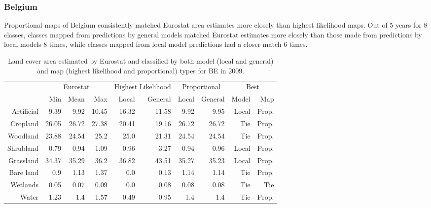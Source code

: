     \subsubsection{Belgium}
    Proportional maps of Belgium consistently matched Eurostat area estimates more closely than highest likelihood maps. Out of 5 years for 8 classes, classes mapped from predictions by general models matched Eurostat estimates more closely than those made from predictions by local models 8 times, while classes mapped from local model predictions had a closer match 6 times.
    \begin{table}[H]
    \centering
    \caption{Land cover area estimated by Eurostat and classified by both model (local and general) and map (highest likelihood and proportional) types for BE in 2009.}
    
    \begin{tabular}{r|rrr|rr|rr|rr}
    \toprule
    {} & \multicolumn{3}{|c}{Eurostat} & \multicolumn{2}{|c}{Highest Likelihood} & \multicolumn{2}{|c}{Proportional} & \multicolumn{2}{|c}{Best} \\
    {} &      Min &   Mean &    Max &              Local & General &        Local & General &  Model &    Map \\
    \midrule
    Artificial &     9.39 &   9.92 &  10.45 &              16.32 &   11.58 &         9.92 &    9.95 &  Local &  Prop. \\
    Cropland   &    26.05 &  26.72 &  27.38 &              20.41 &   19.16 &        26.72 &   26.72 &    Tie &  Prop. \\
    Woodland   &    23.88 &  24.54 &   25.2 &               25.0 &   21.31 &        24.54 &   24.54 &    Tie &  Prop. \\
    Shrubland  &     0.79 &   0.94 &   1.09 &               0.96 &    3.27 &         0.94 &    0.96 &  Local &  Prop. \\
    Grassland  &    34.37 &  35.29 &   36.2 &              36.82 &   43.51 &        35.27 &   35.23 &  Local &  Prop. \\
    Bare land  &      0.9 &   1.13 &   1.37 &                0.0 &    0.13 &         1.14 &    1.14 &    Tie &  Prop. \\
    Wetlands   &     0.05 &   0.07 &   0.09 &                0.0 &    0.08 &         0.08 &    0.08 &    Tie &    Tie \\
    Water      &     1.23 &    1.4 &   1.57 &               0.49 &    0.95 &          1.4 &     1.4 &    Tie &  Prop. \\
    \bottomrule
    \end{tabular}
    \end{table}
    
